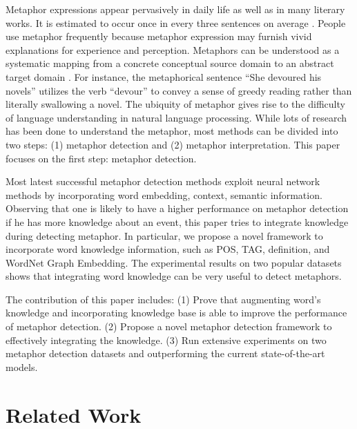 \documentclass[11pt,a4paper]{article}
\begin{document}
Metaphor expressions appear pervasively in daily life as well as in many literary works. It is estimated to occur once in every three sentences on average \cite{bilsky1952ia}. People use metaphor frequently because metaphor expression may furnish vivid explanations for experience and perception. Metaphors can be understood as a systematic mapping from a concrete conceptual source domain to an abstract target domain \cite{1982Lakoff}. For instance, the metaphorical sentence “She devoured his novels” utilizes the verb “devour” to convey a sense of greedy reading rather than literally swallowing a novel. The ubiquity of metaphor gives rise to the difficulty of language understanding in natural language processing. While lots of research has been done to understand the metaphor, most methods can be divided into two steps: (1) metaphor detection and (2) metaphor interpretation. This paper focuses on the first step: metaphor detection. 

Most latest successful metaphor detection methods exploit neural network methods by incorporating word embedding, context, semantic information. Observing that one is likely to have a higher performance on metaphor detection if he has more knowledge about an event, this paper tries to integrate knowledge during detecting metaphor. In particular, we propose a novel framework to incorporate word knowledge information, such as POS, TAG, definition, and WordNet Graph Embedding. The experimental results on two popular datasets shows that integrating word knowledge can be very useful to detect metaphors.

The contribution of this paper includes: (1) Prove that augmenting word’s knowledge and incorporating knowledge base is able to improve the performance of metaphor detection. (2) Propose a novel metaphor detection framework to effectively integrating the knowledge. (3) Run extensive experiments on two metaphor detection datasets and outperforming the current state-of-the-art models.



\section{Related Work}
\end{document}
